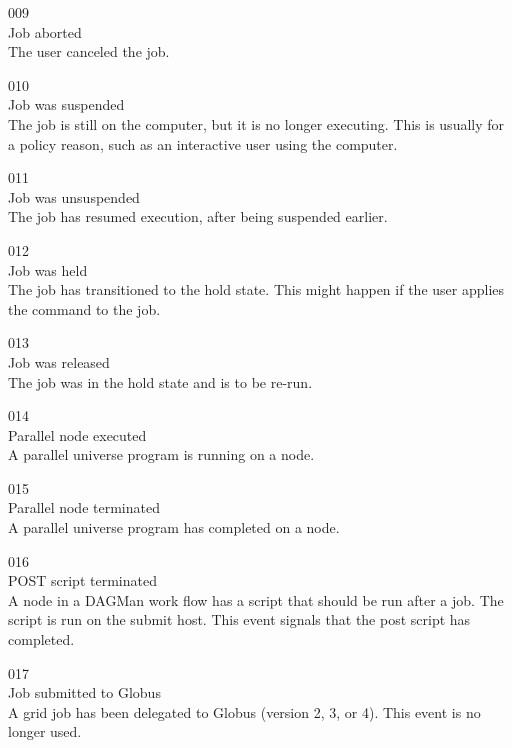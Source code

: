 \noindent{} 009 \\
 Job aborted \\
 The user canceled the job.

\noindent{} 010 \\
 Job was suspended \\
 The job is still on the computer, but it is no longer
executing. 
This is usually for a policy reason, such as an interactive user using
the computer. 

\noindent{} 011 \\
 Job was unsuspended \\
 The job has resumed execution, after being
suspended earlier. 

\noindent{} 012 \\
 Job was held \\
 The job has transitioned to the hold state.
This might happen if the user applies the  command to the job.

\noindent{} 013 \\
 Job was released \\
 The job was in the hold state and is to be re-run.

\noindent{} 014 \\
 Parallel node executed \\
 A parallel universe program is running on a node.

\noindent{} 015 \\
 Parallel node terminated \\
 A parallel universe program has completed on a node.

\noindent{} 016 \\
 POST script terminated \\
 A node in a DAGMan work flow has a script
that should be run after a job. 
The script is run on the submit host. 
This event signals that the post script has completed.

\noindent{} 017 \\
 Job submitted to Globus \\
 A grid job has been delegated to Globus
(version 2, 3, or 4).
This event is no longer used.

